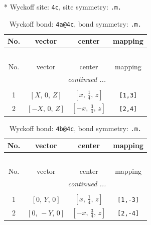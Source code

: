 \documentclass[fleqn,8pt]{jsarticle}
\begin{document}
* Wyckoff site: {\tt 4c}, site symmetry: {\tt .m.}
\renewcommand{\arraystretch}{1.2}
\begin{longtable}{cccc}
\caption{Wyckoff bond: {\tt 4a@4c}, bond symmetry: {\tt .m.}}
 \\
 \hline \hline
No. & vector & center & mapping \\ \hline \endfirsthead

\multicolumn{3}{l}{\tablename\ \thetable{}} \\
 \hline \hline
No. & vector & center & mapping \\ \hline \endhead

 \hline \hline
\multicolumn{3}{r}{\footnotesize\it continued ...} \\ \endfoot

 \hline \hline
\multicolumn{3}{r}{} \\ \endlastfoot

1 & $\left[ X,\, 0,\, Z \right]$ & $\left[ x,\, \frac{1}{4},\, z \right]$ & {\tt [1,3]} \\ \hline
2 & $\left[ - X,\, 0,\, Z \right]$ & $\left[ - x,\, \frac{3}{4},\, z \right]$ & {\tt [2,4]} \\
\end{longtable}
\renewcommand{\arraystretch}{1.2}
\begin{longtable}{cccc}
\caption{Wyckoff bond: {\tt 4b@4c}, bond symmetry: {\tt .m.}}
 \\
 \hline \hline
No. & vector & center & mapping \\ \hline \endfirsthead

\multicolumn{3}{l}{\tablename\ \thetable{}} \\
 \hline \hline
No. & vector & center & mapping \\ \hline \endhead

 \hline \hline
\multicolumn{3}{r}{\footnotesize\it continued ...} \\ \endfoot

 \hline \hline
\multicolumn{3}{r}{} \\ \endlastfoot

1 & $\left[ 0,\, Y,\, 0 \right]$ & $\left[ x,\, \frac{1}{4},\, z \right]$ & {\tt [1,-3]} \\ \hline
2 & $\left[ 0,\, - Y,\, 0 \right]$ & $\left[ - x,\, \frac{3}{4},\, z \right]$ & {\tt [2,-4]} \\
\end{longtable}
\renewcommand{\arraystretch}{1.2}
\end{document}
